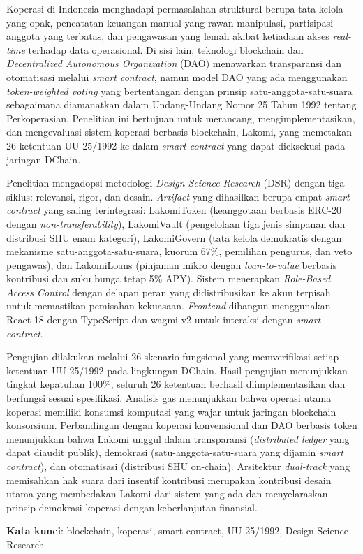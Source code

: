 Koperasi di Indonesia menghadapi permasalahan struktural berupa tata kelola yang opak, pencatatan keuangan manual yang rawan manipulasi, partisipasi anggota yang terbatas, dan pengawasan yang lemah akibat ketiadaan akses \textit{real-time} terhadap data operasional. Di sisi lain, teknologi blockchain dan \textit{Decentralized Autonomous Organization} (DAO) menawarkan transparansi dan otomatisasi melalui \textit{smart contract}, namun model DAO yang ada menggunakan \textit{token-weighted voting} yang bertentangan dengan prinsip satu-anggota-satu-suara sebagaimana diamanatkan dalam Undang-Undang Nomor 25 Tahun 1992 tentang Perkoperasian. Penelitian ini bertujuan untuk merancang, mengimplementasikan, dan mengevaluasi sistem koperasi berbasis blockchain, Lakomi, yang memetakan 26 ketentuan UU 25/1992 ke dalam \textit{smart contract} yang dapat dieksekusi pada jaringan DChain.

Penelitian mengadopsi metodologi \textit{Design Science Research} (DSR) dengan tiga siklus: relevansi, rigor, dan desain. \textit{Artifact} yang dihasilkan berupa empat \textit{smart contract} yang saling terintegrasi: LakomiToken (keanggotaan berbasis ERC-20 dengan \textit{non-transferability}), LakomiVault (pengelolaan tiga jenis simpanan dan distribusi SHU enam kategori), LakomiGovern (tata kelola demokratis dengan mekanisme satu-anggota-satu-suara, kuorum 67\%, pemilihan pengurus, dan veto pengawas), dan LakomiLoans (pinjaman mikro dengan \textit{loan-to-value} berbasis kontribusi dan suku bunga tetap 5\% APY). Sistem menerapkan \textit{Role-Based Access Control} dengan delapan peran yang didistribusikan ke akun terpisah untuk memastikan pemisahan kekuasaan. \textit{Frontend} dibangun menggunakan React 18 dengan TypeScript dan wagmi v2 untuk interaksi dengan \textit{smart contract}.

Pengujian dilakukan melalui 26 skenario fungsional yang memverifikasi setiap ketentuan UU 25/1992 pada lingkungan DChain. Hasil pengujian menunjukkan tingkat kepatuhan 100\%, seluruh 26 ketentuan berhasil diimplementasikan dan berfungsi sesuai spesifikasi. Analisis gas menunjukkan bahwa operasi utama koperasi memiliki konsumsi komputasi yang wajar untuk jaringan blockchain konsorsium. Perbandingan dengan koperasi konvensional dan DAO berbasis token menunjukkan bahwa Lakomi unggul dalam transparansi (\textit{distributed ledger} yang dapat diaudit publik), demokrasi (satu-anggota-satu-suara yang dijamin \textit{smart contract}), dan otomatisasi (distribusi SHU on-chain). Arsitektur \textit{dual-track} yang memisahkan hak suara dari insentif kontribusi merupakan kontribusi desain utama yang membedakan Lakomi dari sistem yang ada dan menyelaraskan prinsip demokrasi koperasi dengan keberlanjutan finansial.

\vspace{1cm}
\noindent\textbf{Kata kunci}: blockchain, koperasi, smart contract, UU 25/1992, Design Science Research
